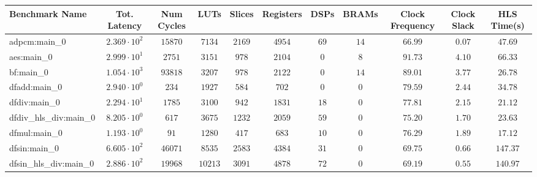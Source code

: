 \begin{tabular}{|l|c|c|c|c|c|c|c|c|c|c|}
\hline
Benchmark Name          & Tot. Latency           & Num Cycles & LUTs      & Slices    & Registers & DSPs    & BRAMs   & Clock Frequency & Clock Slack & HLS Time(s) \\
\hline
adpcm:main\_0           & $ 2.369 \cdot 10^{2} $ & $ 15870  $ & $ 7134  $ & $ 2169  $ & $ 4954  $ & $ 69  $ & $ 14  $ & $ 66.99       $ & $ 0.07    $ & $ 47.69   $ \\
aes:main\_0             & $ 2.999 \cdot 10^{1} $ & $ 2751   $ & $ 3151  $ & $ 978   $ & $ 2104  $ & $ 0   $ & $ 8   $ & $ 91.73       $ & $ 4.10    $ & $ 66.33   $ \\
bf:main\_0              & $ 1.054 \cdot 10^{3} $ & $ 93818  $ & $ 3207  $ & $ 978   $ & $ 2122  $ & $ 0   $ & $ 14  $ & $ 89.01       $ & $ 3.77    $ & $ 26.78   $ \\
dfadd:main\_0           & $ 2.940 \cdot 10^{0} $ & $ 234    $ & $ 1927  $ & $ 584   $ & $ 702   $ & $ 0   $ & $ 0   $ & $ 79.59       $ & $ 2.44    $ & $ 34.78   $ \\
dfdiv:main\_0           & $ 2.294 \cdot 10^{1} $ & $ 1785   $ & $ 3100  $ & $ 942   $ & $ 1831  $ & $ 18  $ & $ 0   $ & $ 77.81       $ & $ 2.15    $ & $ 21.12   $ \\
dfdiv\_hls\_div:main\_0 & $ 8.205 \cdot 10^{0} $ & $ 617    $ & $ 3675  $ & $ 1232  $ & $ 2059  $ & $ 59  $ & $ 0   $ & $ 75.20       $ & $ 1.70    $ & $ 23.63   $ \\
dfmul:main\_0           & $ 1.193 \cdot 10^{0} $ & $ 91     $ & $ 1280  $ & $ 417   $ & $ 683   $ & $ 10  $ & $ 0   $ & $ 76.29       $ & $ 1.89    $ & $ 17.12   $ \\
dfsin:main\_0           & $ 6.605 \cdot 10^{2} $ & $ 46071  $ & $ 8535  $ & $ 2583  $ & $ 4384  $ & $ 31  $ & $ 0   $ & $ 69.75       $ & $ 0.66    $ & $ 147.37  $ \\
dfsin\_hls\_div:main\_0 & $ 2.886 \cdot 10^{2} $ & $ 19968  $ & $ 10213 $ & $ 3091  $ & $ 4878  $ & $ 72  $ & $ 0   $ & $ 69.19       $ & $ 0.55    $ & $ 140.97  $ \\

\end{tabular}
